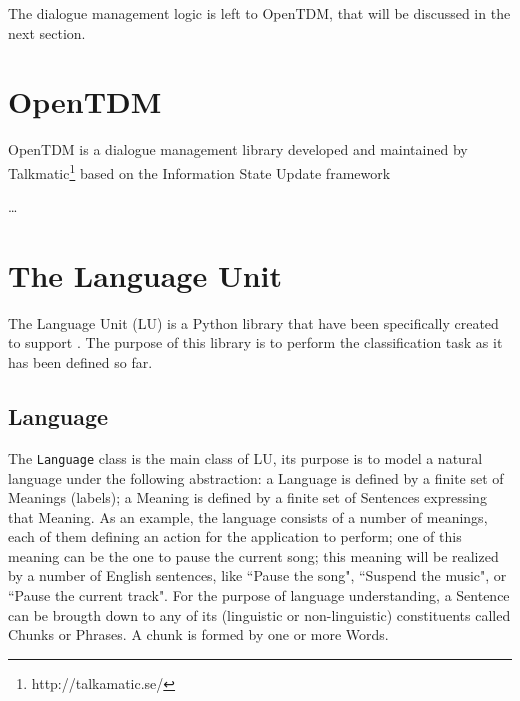 The dialogue management logic is left to OpenTDM, that will be discussed in the next section.



\section{OpenTDM} \label{ch:arch:TDM}
OpenTDM is a dialogue management library developed and maintained by Talkmatic\footnote{http://talkamatic.se/} based on the Information State Update framework

\ldots

\section{The Language Unit} \label{ch:arch:LU}
The Language Unit (LU) is a Python library that have been specifically created to support \pname. The purpose of this library is to perform the classification task as it has been defined so far.

\subsection{Language}
The \texttt{Language} class is the main class of LU, its purpose is to model a natural language under the following abstraction: a Language is defined by a finite set of Meanings (labels); a Meaning is defined by a finite set of Sentences expressing that Meaning. As an example, the \pname language consists of a number of meanings, each of them defining an action for the application to perform; one of this meaning can be the one to pause the current song; this meaning will be realized by a number of English sentences, like ``Pause the song", ``Suspend the music", or ``Pause the current track". For the purpose of language understanding, a Sentence can be brougth down to any of its (linguistic or non-linguistic) constituents called Chunks or Phrases. A chunk is formed by one or more Words.

